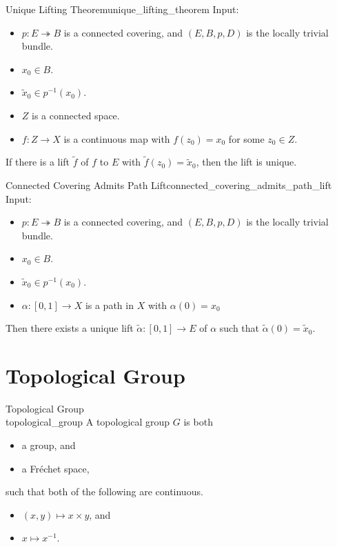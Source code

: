 \documentclass{article}
\begin{document}
\begin{theorem}{Unique Lifting Theorem}{unique_lifting_theorem}
    Input:
    \begin{itemize}
        \item $p:E\twoheadrightarrow B$ is a connected covering, and $(E,B,p,D)$ is the locally trivial bundle.
        \item $x_0 \in B$.
        \item $\tilde{x}_0 \in p^{-1}(x_0)$.
        \item $Z$ is a connected space.
        \item $f:Z\rightarrow X$ is a continuous map with $f(z_0) = x_0$ for some $z_0\in Z$.
    \end{itemize}
    If there is a lift $\tilde{f}$ of $f$ to $E$ with $\tilde{f}(z_0) = \tilde{x}_0$, then the lift is unique.
\end{theorem}

\begin{corollary}{Connected Covering Admits Path Lift}{connected_covering_admits_path_lift}
    Input:
    \begin{itemize}
        \item $p:E\twoheadrightarrow B$ is a connected covering, and $(E,B,p,D)$ is the locally trivial bundle.
        \item $x_0 \in B$.
        \item $\tilde{x}_0 \in p^{-1}(x_0)$.
        \item $\alpha:[0,1]\rightarrow X$ is a path in $X$ with $\alpha(0) = x_0$
    \end{itemize}
    Then there exists a unique lift $\tilde{\alpha}:[0,1]\rightarrow E$ of $\alpha$ such that $\tilde{\alpha}(0) = \tilde{x}_0.$
\end{corollary}

\section{Topological Group}

\begin{definition}{Topological Group \\  }{topological_group}
    A topological group $G$ is both
    \begin{itemize}
        \item a group, and
        \item a Fr\'echet space,
    \end{itemize}
    such that both of the following are continuous.
    \begin{itemize}
        \item $(x,y) \mapsto x\times y$, and
        \item $x \mapsto x^{-1}$.
    \end{itemize}
\end{definition}
\end{document}
